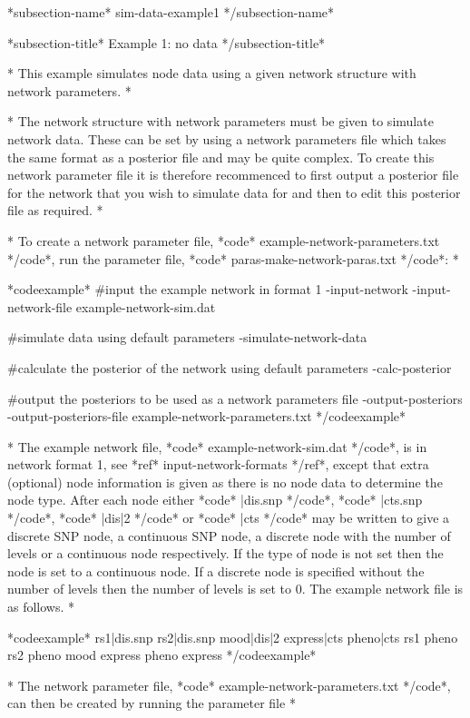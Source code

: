 *subsection-name* sim-data-example1 */subsection-name*

*subsection-title* Example 1: no data */subsection-title*

* This example simulates node data using a given network structure with network parameters. *

* The network structure with network parameters must be given to simulate network data. These can be set by using a network parameters file which takes the same format as a posterior file and may be quite complex. To create this network parameter file it is therefore recommenced to first output a posterior file for the network that you wish to simulate data for and then to edit this posterior file as required. *

* To create a network parameter file, *code* example-network-parameters.txt */code*, run the parameter file, *code* paras-make-network-paras.txt */code*: *

*codeexample* #input the example network in format 1 -input-network -input-network-file example-network-sim.dat

#simulate data using default parameters -simulate-network-data

#calculate the posterior of the network using default parameters -calc-posterior

#output the posteriors to be used as a network parameters file -output-posteriors -output-posteriors-file example-network-parameters.txt */codeexample*

* The example network file, *code* example-network-sim.dat */code*, is in network format 1, see *ref* input-network-formats */ref*, except that extra (optional) node information is given as there is no node data to determine the node type. After each node either *code* |dis.snp */code*, *code* |cts.snp */code*, *code* |dis|2 */code* or *code* |cts */code* may be written to give a discrete SNP node, a continuous SNP node, a discrete node with the number of levels or a continuous node respectively. If the type of node is not set then the node is set to a continuous node. If a discrete node is specified without the number of levels then the number of levels is set to 0. The example network file is as follows. *

*codeexample* rs1|dis.snp rs2|dis.snp mood|dis|2 express|cts pheno|cts rs1 pheno rs2 pheno mood express pheno express */codeexample*

* The network parameter file, *code* example-network-parameters.txt */code*, can then be created by running the parameter file *

